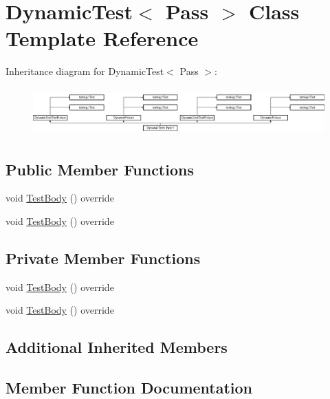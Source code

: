 \hypertarget{class_dynamic_test}{}\section{Dynamic\+Test$<$ Pass $>$ Class Template Reference}
\label{class_dynamic_test}
Inheritance diagram for Dynamic\+Test$<$ Pass $>$\+:\begin{figure}[H]
\begin{center}
\leavevmode
\includegraphics[height=1.842105cm]{d3/d3c/class_dynamic_test}
\end{center}
\end{figure}
\subsection*{Public Member Functions}
\begin{DoxyCompactItemize}
\item 
void \mbox{\hyperlink{class_dynamic_test_afc4a0a94673a3d37709f9cd03e82b821}{Test\+Body}} () override
\item 
void \mbox{\hyperlink{class_dynamic_test_afc4a0a94673a3d37709f9cd03e82b821}{Test\+Body}} () override
\end{DoxyCompactItemize}
\subsection*{Private Member Functions}
\begin{DoxyCompactItemize}
\item 
void \mbox{\hyperlink{class_dynamic_test_afc4a0a94673a3d37709f9cd03e82b821}{Test\+Body}} () override
\item 
void \mbox{\hyperlink{class_dynamic_test_afc4a0a94673a3d37709f9cd03e82b821}{Test\+Body}} () override
\end{DoxyCompactItemize}
\subsection*{Additional Inherited Members}


\subsection{Member Function Documentation}
\mbox{\label{class_dynamic_test_afc4a0a94673a3d37709f9cd03e82b821}} 
